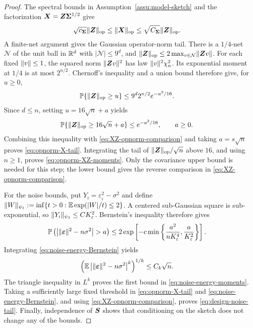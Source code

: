 \documentclass{article}
\theoremstyle{plain} %
\theoremstyle{definition} %
\theoremstyle{definition} %
\begin{document}
\begin{proof}
The spectral bounds in Assumption~\ref{assu:model-sketch} and the
factorization $\boldsymbol{X}=\boldsymbol{Z}\boldsymbol{\Sigma}^{1/2}$ give
\begin{align}
    \sqrt{c_{\boldsymbol{\Sigma}}}\lVert\boldsymbol{Z}\rVert_{\rm op}
    \leq \lVert\boldsymbol{X}\rVert_{\rm op}
    \leq \sqrt{C_{\boldsymbol{\Sigma}}}\lVert\boldsymbol{Z}\rVert_{\rm op}.
    \label{eq:XZ-opnorm-comparison}
\end{align}
A finite-net argument gives the Gaussian
operator-norm tail. There is a $1/4$-net $\mathcal N$ of the unit ball in
${\mathbb{R}}^d$ with $|\mathcal N|\leq9^d$, and
$\lVert\boldsymbol{Z}\rVert_{\rm op}\leq2\max_{v\in\mathcal N}\lVert\boldsymbol{Z} v\rVert$.
For each fixed $\lVert v\rVert\leq1$, the squared norm $\lVert\boldsymbol{Z} v\rVert^2$ has law
$\lVert v\rVert^2\chi_n^2$. Its exponential moment at $1/4$ is at most $2^{n/2}$.
Chernoff's inequality and a union bound therefore give, for $u\geq0$,
\begin{align*}
    {\mathbb{P}}\{\lVert\boldsymbol{Z}\rVert_{\rm op}\geq u\}
       \leq9^d2^{n/2}e^{-u^2/16}.
\end{align*}
Since $d\leq n$, setting $u=16\sqrt n+a$ yields
\begin{align*}
    {\mathbb{P}}\{\lVert\boldsymbol{Z}\rVert_{\rm op}\geq16\sqrt n+a\}
       \leq e^{-a^2/16},\qquad a\geq0.
\end{align*}
Combining this inequality with \eqref{eq:XZ-opnorm-comparison} and taking
$a=s\sqrt n$ proves \eqref{eq:opnorm-X-tail}. Integrating the tail of
$\lVert\boldsymbol{Z}\rVert_{\rm op}/\sqrt n$ above $16$, and using $n\geq1$, proves
\eqref{eq:opnorm-XZ-moments}. Only the covariance upper bound is needed
for this step; the lower bound gives the reverse comparison in
\eqref{eq:XZ-opnorm-comparison}.

For the noise bounds, put $Y_i=\varepsilon_i^2-\sigma^2$ and define
$\lVert W\rVert_{\psi_1}:=\inf\{t>0:{\mathbb{E}}\exp(|W|/t)\leq2\}$.
A centered sub-Gaussian square is
sub-exponential, so $\lVert Y_i\rVert_{\psi_1}\leq C K_\varepsilon^2$.
Bernstein's inequality therefore gives
\begin{align}
    \P\left(
       \left|\norm{\bep}^2-n\sigma^2\right|>a
    \right)
    \leq
    2\exp\left[
       -c\min\left\{
          \frac{a^2}{nK_\varepsilon^4},
          \frac{a}{K_\varepsilon^2}
       \right\}
    \right].
    \label{eq:noise-energy-Bernstein}
\end{align}
Integrating \eqref{eq:noise-energy-Bernstein} yields
\begin{align*}
    \left(
       {\mathbb{E}}\left|\lVert{\boldsymbol{\varepsilon} }\rVert^2-n\sigma^2\right|^k
    \right)^{1/k}
    \leq C_k\sqrt n.
\end{align*}
The triangle inequality in $L^k$ proves the first bound in
\eqref{eq:noise-energy-moments}.  Taking a sufficiently large fixed threshold
in \eqref{eq:opnorm-X-tail} and \eqref{eq:noise-energy-Bernstein}, and using
\eqref{eq:XZ-opnorm-comparison}, proves \eqref{eq:design-noise-tail}.
Finally, independence of $\boldsymbol{S}$ shows that conditioning on the sketch does not
change any of the bounds.
\end{proof}
\end{document}
